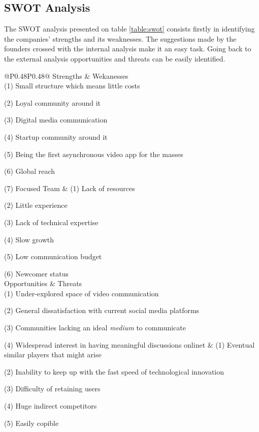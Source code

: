 \documentclass[12pt]{article}
\begin{document}
\subsection{SWOT Analysis}
The SWOT analysis presented on table \ref{table:swot} consists firstly in identifying the companies' strengths and its weaknesses. The suggestions made by the founders crossed with the internal analysis make it an easy task. Going back to the external analysis opportunities and threats can be easily identified. 

\begin{table}[htbp]
\small
\caption{SWOT analysis}
\label{table:swot}
\centering
\begin{tabular}{ @{}P{0.48\textwidth}P{0.48\textwidth}@{} }
\hline
Strengths                             &  Wekanesses                                                                                                                                                                                                                                                                                                                                                            
\\ \hline  
(1) Small structure which means little costs \par (2) Loyal community around it \par (3) Digital media communication \par (4) Startup community around it \par 	(5) Being the first asynchronous video app for the masses \par (6) Global reach \par (7) Focused Team & (1) Lack of resources \par (2) Little experience \par (3) Lack of technical expertise \par (4) Slow growth  \par (5) Low communication budget \par (6) Newcomer status  \\                                                                                                                                                                                                                    \hline
Opportunities		&	Threats
\\ \hline
 (1) Under-explored space of video communication \par (2) General dissatisfaction with current social media platforms \par (3) Communities lacking an ideal \textit{medium} to communicate	\par (4) Widespread interest in having meaningful discussions onlinet	&  (1) Eventual similar players that might arise \par (2) Inability to keep up with the fast speed of technological innovation \par (3) Difficulty of retaining users  \par (4) Huge indirect competitors \par (5) Easily copible
 \\ \hline
\end{tabular}
\end{table}
\end{document}
